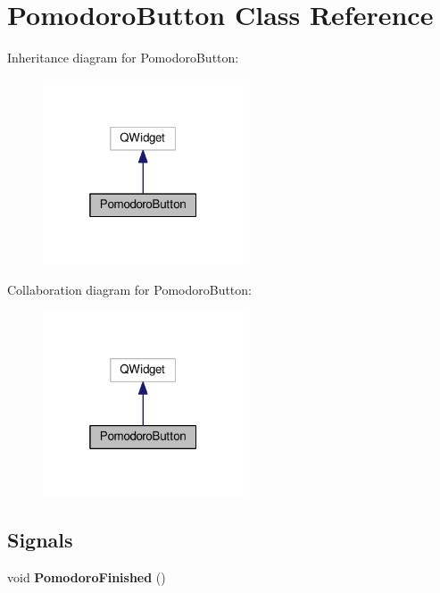 \hypertarget{class_pomodoro_button}{}\section{Pomodoro\+Button Class Reference}
\label{class_pomodoro_button}


Inheritance diagram for Pomodoro\+Button\+:\nopagebreak
\begin{figure}[H]
\begin{center}
\leavevmode
\includegraphics[width=169pt]{class_pomodoro_button__inherit__graph}
\end{center}
\end{figure}


Collaboration diagram for Pomodoro\+Button\+:\nopagebreak
\begin{figure}[H]
\begin{center}
\leavevmode
\includegraphics[width=169pt]{class_pomodoro_button__coll__graph}
\end{center}
\end{figure}
\subsection*{Signals}
\begin{DoxyCompactItemize}
\item 
void {\bfseries Pomodoro\+Finished} ()\hypertarget{class_pomodoro_button_ac2392efd371986fcb20c5b29562fcc46}{}\label{class_pomodoro_button_ac2392efd371986fcb20c5b29562fcc46}

\end{DoxyCompactItemize}
